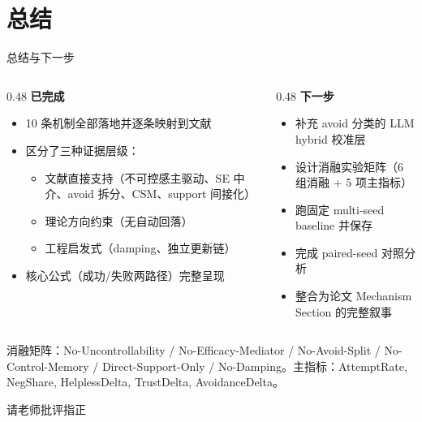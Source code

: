 \documentclass[aspectratio=169]{beamer}
\newcommand{\framebottomnote}[1]{%
    \vfill
    \par\noindent
    {\tiny\color{black!65}\parbox{0.96\linewidth}{#1}\par}%
    \vspace*{-0.75cm}%
}
\begin{document}
\section{总结}

\begin{frame}{总结与下一步}

\begin{columns}[T]
\begin{column}{0.48\textwidth}
\textbf{已完成}
\begin{itemize}
    \item 10 条机制全部落地并逐条映射到文献
    \item 区分了三种证据层级：
    \begin{itemize}
        \scriptsize
        \item 文献直接支持（不可控感主驱动、SE 中介、avoid 拆分、CSM、support 间接化）
        \item 理论方向约束（无自动回落）
        \item 工程启发式（damping、独立更新链）
    \end{itemize}
    \item 核心公式（成功/失败两路径）完整呈现
\end{itemize}
\end{column}

\begin{column}{0.48\textwidth}
\textbf{下一步}
\begin{itemize}
    \item 补充 avoid 分类的 LLM hybrid 校准层
    \item 设计消融实验矩阵（6 组消融 + 5 项主指标）
    \item 跑固定 multi-seed baseline 并保存
    \item 完成 paired-seed 对照分析
    \item 整合为论文 Mechanism Section 的完整叙事
\end{itemize}
\end{column}
\end{columns}

\framebottomnote{消融矩阵：No-Uncontrollability / No-Efficacy-Mediator / No-Avoid-Split / No-Control-Memory / Direct-Support-Only / No-Damping。主指标：AttemptRate, NegShare, HelplessDelta, TrustDelta, AvoidanceDelta。}
\end{frame}

\begin{frame}
    \centering
    \Huge{请老师批评指正}
\end{frame}
\end{document}
